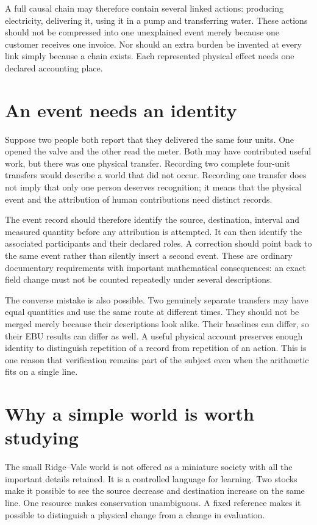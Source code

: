 A full causal chain may therefore contain several linked actions: producing electricity, delivering it, using it in a pump and transferring water. These actions should not be compressed into one unexplained event merely because one customer receives one invoice. Nor should an extra burden be invented at every link simply because a chain exists. Each represented physical effect needs one declared accounting place.

\section{An event needs an identity}
Suppose two people both report that they delivered the same four units. One opened the valve and the other read the meter. Both may have contributed useful work, but there was one physical transfer. Recording two complete four-unit transfers would describe a world that did not occur. Recording one transfer does not imply that only one person deserves recognition; it means that the physical event and the attribution of human contributions need distinct records.

The event record should therefore identify the source, destination, interval and measured quantity before any attribution is attempted. It can then identify the associated participants and their declared roles. A correction should point back to the same event rather than silently insert a second event. These are ordinary documentary requirements with important mathematical consequences: an exact field change must not be counted repeatedly under several descriptions.

The converse mistake is also possible. Two genuinely separate transfers may have equal quantities and use the same route at different times. They should not be merged merely because their descriptions look alike. Their baselines can differ, so their EBU results can differ as well. A useful physical account preserves enough identity to distinguish repetition of a record from repetition of an action. This is one reason that verification remains part of the subject even when the arithmetic fits on a single line.

\section{Why a simple world is worth studying}
The small Ridge--Vale world is not offered as a miniature society with all the important details retained. It is a controlled language for learning. Two stocks make it possible to see the source decrease and destination increase on the same line. One resource makes conservation unambiguous. A fixed reference makes it possible to distinguish a physical change from a change in evaluation.

